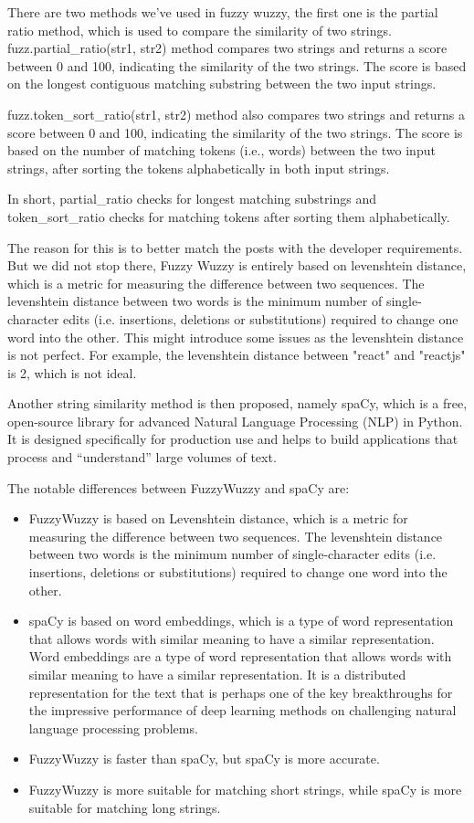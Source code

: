 There are two methods we've used in fuzzy wuzzy, the first one is the partial ratio method, which is used to compare the similarity of two strings. fuzz.partial\_ratio(str1, str2) method compares two strings and returns a score between 0 and 100, indicating the similarity of the two strings. The score is based on the longest contiguous matching substring between the two input strings.

fuzz.token\_sort\_ratio(str1, str2) method also compares two strings and returns a score between 0 and 100, indicating the similarity of the two strings. The score is based on the number of matching tokens (i.e., words) between the two input strings, after sorting the tokens alphabetically in both input strings.

In short, partial\_ratio checks for longest matching substrings and token\_sort\_ratio checks for matching tokens after sorting them alphabetically.

The reason for this is to better match the posts with the developer requirements. But we did not stop there, Fuzzy Wuzzy is entirely based on levenshtein distance, which is a metric for measuring the difference between two sequences. The levenshtein distance between two words is the minimum number of single-character edits (i.e. insertions, deletions or substitutions) required to change one word into the other. This might introduce some issues as the levenshtein distance is not perfect. For example, the levenshtein distance between "react" and "reactjs" is 2, which is not ideal. 

Another string similarity method is then proposed, namely spaCy, which is a free, open-source library for advanced Natural Language Processing (NLP) in Python. It is designed specifically for production use and helps to build applications that process and “understand” large volumes of text. 

The notable differences between FuzzyWuzzy and spaCy are:
\begin{itemize}
    \item FuzzyWuzzy is based on Levenshtein distance, which is a metric for measuring the difference between two sequences. The levenshtein distance between two words is the minimum number of single-character edits (i.e. insertions, deletions or substitutions) required to change one word into the other.
    \item spaCy is based on word embeddings, which is a type of word representation that allows words with similar meaning to have a similar representation. Word embeddings are a type of word representation that allows words with similar meaning to have a similar representation. It is a distributed representation for the text that is perhaps one of the key breakthroughs for the impressive performance of deep learning methods on challenging natural language processing problems.
    \item  FuzzyWuzzy is faster than spaCy, but spaCy is more accurate.
    \item  FuzzyWuzzy is more suitable for matching short strings, while spaCy is more suitable for matching long strings.
\end{itemize}

